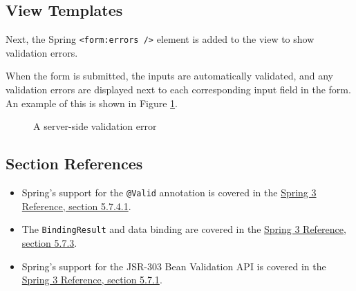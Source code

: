 \documentclass{article}
\begin{document}
\subsection{View Templates}

Next, the Spring \texttt{<form:errors />} element is added to the view to show validation errors.



When the form is submitted, the inputs are automatically validated, and any validation errors are displayed next to each corresponding input field in the form.  An example of this is shown in Figure \ref{fig:server-side-validation/employee}.

\vspace{10pt}
\begin{figure}[H]
\begin{center}
\end{center}
\caption{A server-side validation error}
\label{fig:server-side-validation/employee}
\end{figure}

\subsection{Section References}

\begin{itemize}
\item Spring's support for the \texttt{@Valid} annotation is covered in the \href{http://static.springsource.org/spring/docs/3.0.x/spring-framework-reference/html/validation.html#validation-mvc-triggering}{Spring 3 Reference, section 5.7.4.1}.
\item The \texttt{BindingResult} and data binding are covered in the \href{http://static.springsource.org/spring/docs/3.0.x/spring-framework-reference/html/validation.html#validation-binder}{Spring 3 Reference, section 5.7.3}.
\item Spring's support for the JSR-303 Bean Validation API is covered in the \href{http://static.springsource.org/spring/docs/3.0.x/spring-framework-reference/html/validation.html#validation-beanvalidation-overview}{Spring 3 Reference, section 5.7.1}.
\end{itemize}
\end{document}
